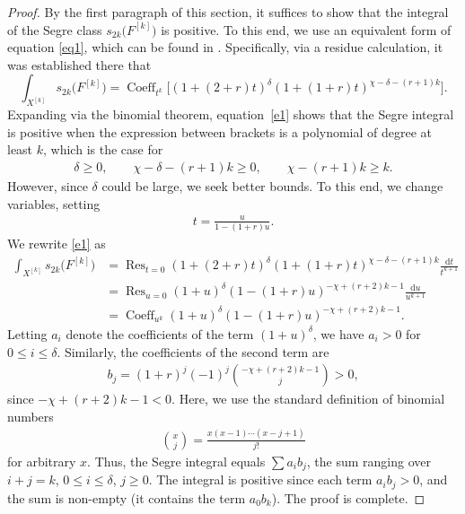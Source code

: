 \documentclass[pdftex]{sigma}
\numberwithin{equation}{section}
\begin{document}
\begin{proof}
By the first paragraph of this section, it suffices to show that the integral of the Segre class $s_{2k}\big(F^{[k]}\big)$ is positive. To this end, we use an equivalent form of equation \eqref{eq1}, which can be found in \cite[p.~11]{MOP}.
Specifically, via a residue calculation, it was established there that
\begin{equation}\label{e1}
\int_{X^{[k]}} s_{2k}\big(F^{[k]}\big)=\operatorname{Coeff}_{ t^k} \bigl[(1+ (2+r)t)^{\delta} (1+(1+r)t)^{\chi -\delta - (r+1)k} \bigr].
\end{equation}
Expanding via the binomial theorem, equation~\eqref{e1} shows that the Segre integral is positive when the expression between brackets is a polynomial of degree at least $k$, which is the case for
\begin{gather*}
\delta\geq 0, \qquad \chi- \delta - (r+1)k\geq 0,\qquad \chi-(r+1)k\geq k.
\end{gather*}
However, since $\delta$ could be large, we seek better bounds. To this end, we change variables, setting \begin{gather*}
t=\frac{u}{1-(1+r)u}.
\end{gather*}
We rewrite \eqref{e1} as
\begin{align*}
\int_{X^{[k]}} s_{2k}\big(F^{[k]}\big)&=\operatorname{Res}_{t=0} (1+ (2+r)t)^{\delta} (1+(1+r)t)^{\chi -\delta - (r+1)k} \frac{\mathrm dt}{t^{k+1}}
\\
&= \operatorname{Res}_{u=0} (1+u)^{\delta} (1-(1+r)u)^{-\chi + (r+2) k-1} \frac{\mathrm du}{u^{k+1}}
\\
&= \operatorname{Coeff}_{u^k} (1+u)^{\delta} (1-(1+r)u)^{-\chi + (r+2) k-1}.
\end{align*}
Letting $a_i$ denote the coefficients of the term $(1+u)^{\delta}$, we have $a_i>0$ for $0\leq i\leq \delta$. Similarly, the coefficients of the second term are
\begin{gather*}
b_j=(1+r)^j (-1)^j \binom{-\chi +(r+2)k-1}{j}>0,
\end{gather*}
since $-\chi+(r+2)k-1<0$. Here, we use the standard definition of binomial numbers
\begin{gather*}
\binom{x}{j}=\frac{x(x-1)\cdots (x-j+1)}{j!}
\end{gather*}
for arbitrary $x$. Thus, the Segre integral equals $\sum a_i b_j$, the sum ranging over $i+j=k$, $0\leq i\leq \delta$, $j\geq 0$. The integral is positive since each term $a_ib_j>0$, and the sum is non-empty (it contains the term $a_0b_k$). The proof is complete.
\end{proof}
\end{document}
